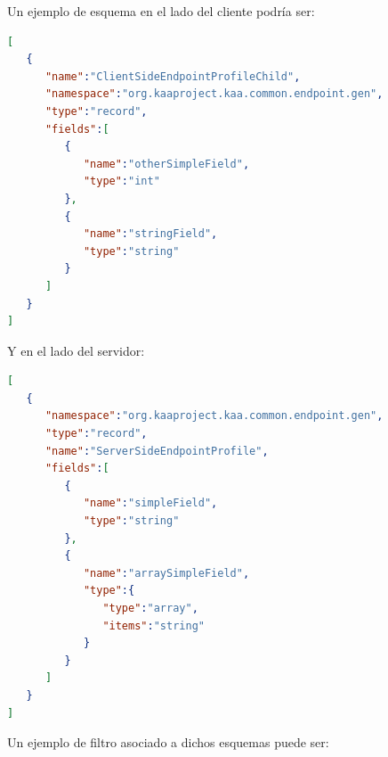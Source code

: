 \documentclass[12pt, twoside]{book}
\begin{document}
Un ejemplo de esquema en el lado del cliente podría ser:
\begin{lstlisting}[language=json,firstnumber=1]
[  
   {  
      "name":"ClientSideEndpointProfileChild",
      "namespace":"org.kaaproject.kaa.common.endpoint.gen",
      "type":"record",
      "fields":[  
         {  
            "name":"otherSimpleField",
            "type":"int"
         },
         {  
            "name":"stringField",
            "type":"string"
         }
      ]
   }
]
\end{lstlisting}
Y en el lado del servidor:
\begin{lstlisting}[language=json]
[  
   {  
      "namespace":"org.kaaproject.kaa.common.endpoint.gen",
      "type":"record",
      "name":"ServerSideEndpointProfile",
      "fields":[  
         {  
            "name":"simpleField",
            "type":"string"
         },
         {  
            "name":"arraySimpleField",
            "type":{  
               "type":"array",
               "items":"string"
            }
         }
      ]
   }
]
\end{lstlisting}
Un ejemplo de filtro asociado a dichos esquemas puede ser:\\

\end{document}
